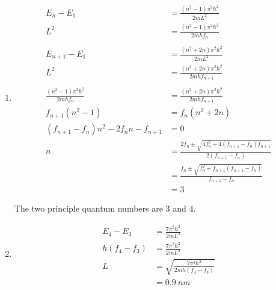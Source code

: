 \documentclass{article}
\begin{document}
\begin{enumerate}
  \item

        \begin{align*}
          E_n - E_1                                   & = \frac{(n^2 - 1) \pi^2 \hbar^2}{2 m L^2}                                              \\
          L^2                                         & = \frac{(n^2 - 1) \pi^2 \hbar^2}{2 m h f_n}                                            \\ \\
          E_{n + 1} - E_1                             & = \frac{(n^2 + 2 n) \pi^2 \hbar^2}{2 m L^2}                                            \\
          L^2                                         & = \frac{(n^2 + 2n) \pi^2 \hbar^2}{2 m h f_{n + 1}}                                     \\ \\
          \frac{(n^2 - 1) \pi^2 \hbar^2}{2 m h f_n}   & = \frac{(n^2 + 2n) \pi^2 \hbar^2}{2 m h f_{n + 1}}                                     \\
          f_{n + 1} (n^2 - 1)                         & = f_n (n^2 + 2 n)                                                                      \\
          (f_{n + 1} - f_n) n^2 - 2 f_n n - f_{n + 1} & = 0                                                                                    \\
          n                                           & = \frac{2 f_n \pm \sqrt{4 f_n^2 + 4 (f_{n + 1} - f_n) f_{n + 1}}}{2 (f_{n + 1} - f_n)} \\
                                                      & = \frac{f_n \pm \sqrt{f_n^2 + f_{n + 1} (f_{n + 1} - f_n)}}{f_{n + 1} - f_n}           \\
                                                      & = 3
        \end{align*}

        The two principle quantum numbers are $3$ and $4$.

  \item

        \begin{align*}
          E_4 - E_3     & = \frac{7 \pi^2 \hbar^2}{2 m L^2}                  \\
          h (f_4 - f_3) & = \frac{7 \pi^2 \hbar^2}{2 m L^2}                  \\
          L             & = \sqrt{\frac{7 \pi^2 \hbar^2}{2 m h (f_4 - f_3)}} \\
                        & = \qty{0.9}{nm}
        \end{align*}


\end{enumerate}
\end{document}
